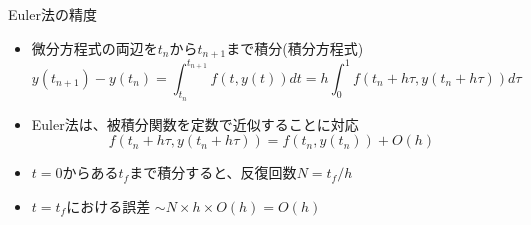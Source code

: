 \begin{frame}[t,fragile]{Euler法の精度}
  \begin{itemize}
  \item 微分方程式の両辺を$t_n$から$t_{n+1}$まで積分(積分方程式)
    \[
    y(t_{n+1}) - y(t_n) = \int^{t_{n+1}}_{t_n} \!\! f(t, y(t)) dt = h \int^1_0 \! f(t_n+h\tau, y(t_n+h\tau)) d\tau
    \]
  \item Euler法は、被積分関数を定数で近似することに対応
    \[
    f(t_n+h\tau, y(t_n+h\tau)) = f(t_n, y(t_n)) + O(h)
    \]
  \item $t=0$からある$t_f$まで積分すると、反復回数$N = t_f / h$
  \item $t=t_f$における誤差 $\sim N \times h \times O(h) = O(h)$
  \end{itemize}
\end{frame}

